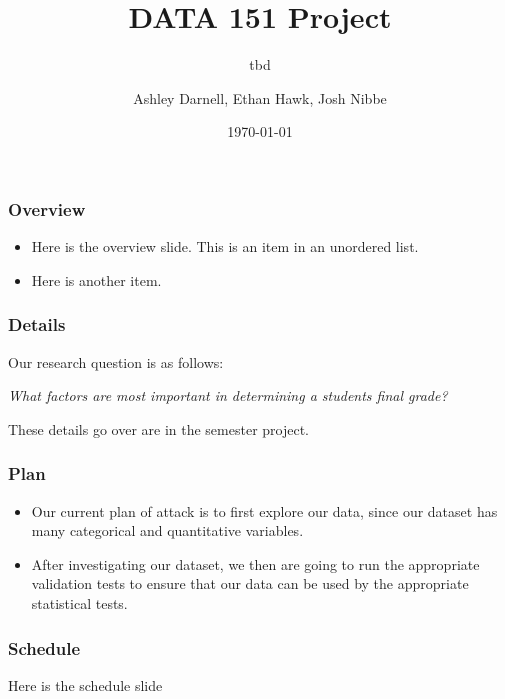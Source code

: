 \documentclass{beamer}
\title{DATA 151 Project}
\subtitle{tbd}
\author{Ashley Darnell, Ethan Hawk, Josh Nibbe}
\institute{Valparaiso University}
\date{\today}
\begin{document}
\begin{frame}
\titlepage
\end{frame}


\begin{frame}
\frametitle{Overview}
  \begin{itemize}
    \item Here is the overview slide. This is an item in an unordered list.

    \item Here is another item.
  \end{itemize}
\end{frame}


\begin{frame}
\frametitle{Details}
Our research question is as follows:

  \begin{center}
    \textit{What factors are most important in determining a students final grade?}
  \end{center}


These details go over are in the semester project.  
\end{frame}


\begin{frame}
\frametitle{Plan}
  \begin{itemize}
    \item Our current plan of attack is to first explore our data, since our dataset has many categorical and 
quantitative variables.

    \item After investigating our dataset, we then are going to run the appropriate validation tests to ensure that our data
can be used by the appropriate statistical tests.

  \end{itemize}
\end{frame}

\begin{frame}
\frametitle{Schedule}
Here is the schedule slide
\end{frame}
\end{document}
